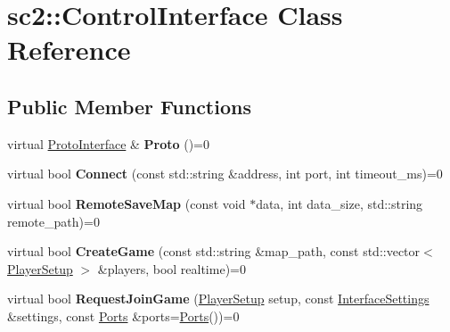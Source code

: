 \hypertarget{classsc2_1_1_control_interface}{}\section{sc2\+:\+:Control\+Interface Class Reference}
\label{classsc2_1_1_control_interface}
\subsection*{Public Member Functions}
\begin{DoxyCompactItemize}
\item 
\mbox{\label{classsc2_1_1_control_interface_ab90c8107014b8da21ba1d88fdb35aada}} 
virtual \hyperlink{classsc2_1_1_proto_interface}{Proto\+Interface} \& {\bfseries Proto} ()=0
\item 
\mbox{\label{classsc2_1_1_control_interface_a2e8bb94501a1772bfd98f8feb45180d4}} 
virtual bool {\bfseries Connect} (const std\+::string \&address, int port, int timeout\+\_\+ms)=0
\item 
\mbox{\label{classsc2_1_1_control_interface_afc307e6dc47a1cbbeb47055b199fe3e1}} 
virtual bool {\bfseries Remote\+Save\+Map} (const void $\ast$data, int data\+\_\+size, std\+::string remote\+\_\+path)=0
\item 
\mbox{\label{classsc2_1_1_control_interface_a4cd74e4ecacb4fad4aa35b749fd03863}} 
virtual bool {\bfseries Create\+Game} (const std\+::string \&map\+\_\+path, const std\+::vector$<$ \hyperlink{structsc2_1_1_player_setup}{Player\+Setup} $>$ \&players, bool realtime)=0
\item 
\mbox{\label{classsc2_1_1_control_interface_a4a2e65b28281bfc5024a62f1a4fba99e}} 
virtual bool {\bfseries Request\+Join\+Game} (\hyperlink{structsc2_1_1_player_setup}{Player\+Setup} setup, const \hyperlink{structsc2_1_1_interface_settings}{Interface\+Settings} \&settings, const \hyperlink{structsc2_1_1_ports}{Ports} \&ports=\hyperlink{structsc2_1_1_ports}{Ports}())=0
\item 
\mbox{\label{classsc2_1_1_control_interface_adddde8ba93c8a71d3af5cf38e83e7e9e}} 

\end{DoxyCompactItemize}
